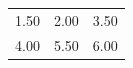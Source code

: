 \begin{table}[htbp]
\centering
\begin{tabular}{ccc}
\hline
1.50 & 2.00 & 3.50 \\
4.00 & 5.50 & 6.00 \\
\hline
\end{tabular}
\end{table}
